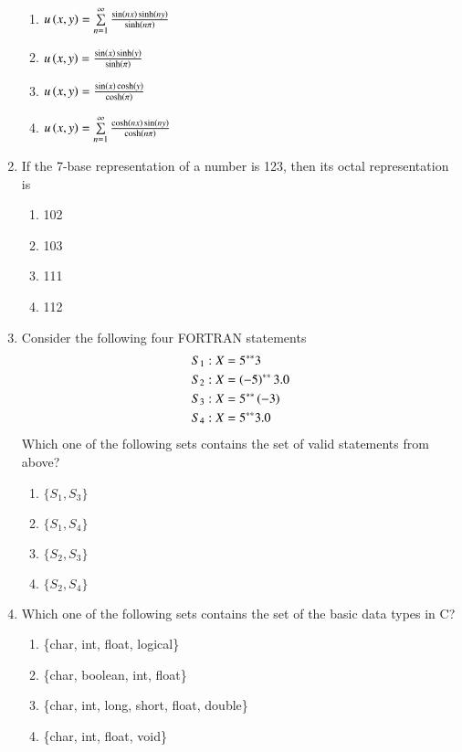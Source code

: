 \documentclass[journal]{IEEEtran}
\begin{document}
\begin{enumerate}
\begin{enumerate}
    \item $u\left(x, y\right) = \sum\limits_{n=1}^{\infty}\frac{\sin\left(nx\right)\sinh\left(ny\right)}{\sinh\left(n\pi\right)}$
    \item $u\left(x, y\right) = \frac{\sin\left(x\right)\sinh\left(y\right)}{\sinh\left(\pi\right)}$
    \item $u\left(x, y\right) = \frac{\sin\left(x\right)\cosh\left(y\right)}{\cosh\left(\pi\right)}$
    \item $u\left(x, y\right) = \sum\limits_{n=1}^{\infty}\frac{\cosh\left(nx\right)\sin\left(ny\right)}{\cosh\left(n\pi\right)}$ \\
\end{enumerate}
\item If the 7-base representation of a number is 123, then its octal representation is
\begin{enumerate}
    \item 102
    \item 103
    \item 111
    \item 112 \\
\end{enumerate}
\item Consider the following four FORTRAN statements
\begin{align*}
    S_1: X & = 5^{**}3 \\
    S_2: X & = \left(-5\right)^{**}3.0 \\
    S_3: X & = 5^{**}\left(-3\right) \\
    S_4: X & = 5^{**}3.0
\end{align*}
Which one of the following sets contains the set of valid statements from above?
\begin{enumerate}
    \item $\{S_1, S_3\}$
    \item $\{S_1, S_4\}$
    \item $\{S_2, S_3\}$
    \item $\{S_2, S_4\}$ \\
\end{enumerate}
\item Which one of the following sets contains the set of the basic data types in C?
\begin{enumerate}
   \item \{char, int, float, logical\}
   \item \{char, boolean, int, float\}
   \item \{char, int, long, short, float, double\}
   \item \{char, int, float, void\} \\

\end{enumerate}
\end{enumerate}
\end{document}
